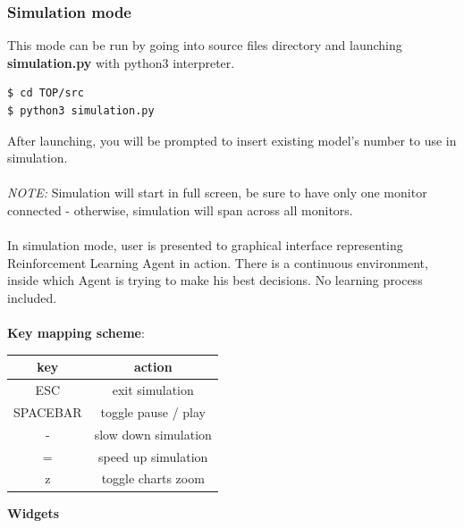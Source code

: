 \documentclass{article}
\begin{document}
\subsubsection{Simulation mode}
This mode can be run by going into source files directory and launching \textbf{simulation.py}
 with python3 interpreter. 
\begin{lstlisting}
$ cd TOP/src
$ python3 simulation.py
\end{lstlisting}
After launching, you will be prompted to insert existing model's number to use in simulation. 
\\\\
\textit{NOTE:} Simulation will start in full screen, be sure to have only one monitor connected - otherwise, simulation will span across all monitors.
\\\\
In simulation mode, user is presented to graphical interface representing Reinforcement Learning
Agent in action. 
There is a continuous environment, inside which Agent is trying to make his best decisions. No
learning process included.  \\\\
\textbf{Key mapping scheme}: \\
\begin{center}
{\def\arraystretch{1.3}\tabcolsep=10pt
\begin{tabular}{c | c }
\textbf{key} & \textbf{action} \\ \hline
ESC & exit simulation \\ \hline
SPACEBAR & toggle pause / play \\ \hline
- & slow down simulation \\ \hline
= & speed up simulation \\ \hline
z & toggle charts zoom \\ 
\end{tabular}}
\end{center}
\textbf{Widgets}
\end{document}
